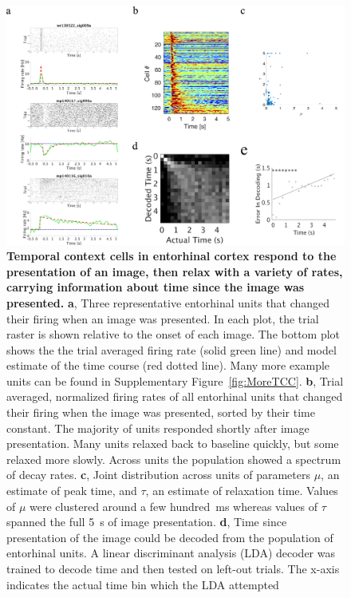 \documentclass{apa}
\begin{document}
\begin{figure}
	\centering
	\includegraphics[width=1\textwidth]{figs/TemporalContextCells.png}
		\caption{
			\textbf{Temporal context cells in entorhinal cortex respond to the
					presentation of an image, then relax with a variety of
					rates, carrying information about time since the image was
					presented.
			}
			\textbf{a}, Three representative entorhinal units that changed their
			firing when an image was presented. In each plot, the trial raster
			is shown relative to the onset of
			each image. The bottom plot shows the the trial averaged firing
			rate (solid green line) and model estimate of the time course (red
			dotted line).  
			Many more example units can be found in Supplementary
			Figure~\ref{fig:MoreTCC}.
			\textbf{b}, Trial averaged, normalized firing rates
			of all entorhinal units that changed their firing when the image
			was presented, sorted by their time constant.  The majority of
			units responded shortly after image presentation.  Many units
			relaxed back to baseline quickly, but some relaxed more slowly.
			Across units the population showed a spectrum of decay rates.
			\textbf{c},  Joint distribution across units of parameters $\mu$, an
			estimate of peak time, and $\tau$, an estimate of 
			relaxation time.  Values of
			$\mu$ were clustered around a few hundred~ms whereas values of
			$\tau$ spanned the full 5~s of image presentation.  \textbf{d},
			Time since presentation of the image could be decoded from the
			population of entorhinal units.  A linear discriminant analysis
			(LDA) decoder was trained to decode time and then tested on
			left-out trials.
			The x-axis indicates the actual time bin which the LDA attempted
}
\end{figure}
\end{document}
